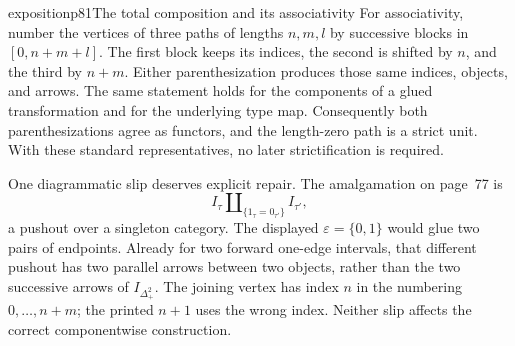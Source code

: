 \begin{dcomment}{exposition}{p81}{The total composition and its associativity}
For associativity, number the vertices of three paths of lengths $n,m,l$ by successive blocks in $[0,n+m+l]$. The first block keeps its indices, the second is shifted by $n$, and the third by $n+m$. Either parenthesization produces those same indices, objects, and arrows. The same statement holds for the components of a glued transformation and for the underlying type map. Consequently both parenthesizations agree as functors, and the length-zero path is a strict unit. With these standard representatives, no later strictification is required.

One diagrammatic slip deserves explicit repair. The amalgamation on page~77 is
\[
 I_\tau\amalg_{\{1_\tau=0_{\tau'}\}}I_{\tau'},
\]
a pushout over a singleton category. The displayed $\varepsilon=\{0,1\}$ would glue two pairs of endpoints. Already for two forward one-edge intervals, that different pushout has two parallel arrows between two objects, rather than the two successive arrows of $I_{\Delta_+^2}$. The joining vertex has index $n$ in the numbering $0,\ldots,n+m$; the printed $n+1$ uses the wrong index. Neither slip affects the correct componentwise construction.
\end{dcomment}

